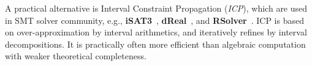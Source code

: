 \documentclass[runningheads,a4paper,oribibl]{llncs}
\begin{document}
A practical alternative is Interval Constraint Propagation ({\em ICP}), 
which are used in SMT solver community, e.g., {\bf iSAT3}~\cite{isat}, 
{\bf dReal}~\cite{dRealCADE13}, and \textbf{RSolver}~\cite{rsolver}. 
ICP is based on over-approximation by interval arithmetics, and iteratively refines by
interval decompositions. 
It is practically often more efficient than algebraic computation 
with weaker theoretical completeness. 

\end{document}
